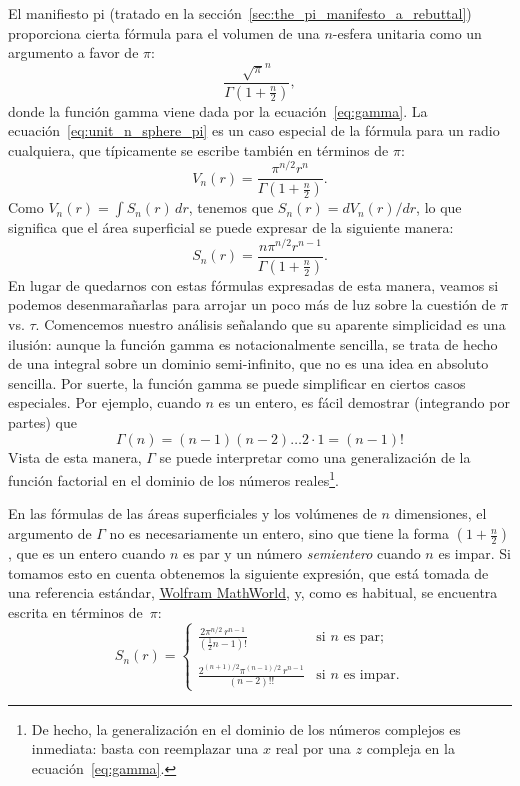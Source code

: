 El manifiesto pi (tratado en la sección~\ref{sec:the_pi_manifesto_a_rebuttal}) proporciona cierta fórmula para el volumen de una $n$-esfera unitaria como un argumento a favor de $\pi$:
\begin{equation}
\label{eq:unit_n_sphere_pi}
\frac{\sqrt{\pi}^{n} }{\Gamma(1 + \frac{n}{2})},
\end{equation}
donde la función gamma viene dada por la ecuación~\eqref{eq:gamma}. La ecuación~\eqref{eq:unit_n_sphere_pi} es un caso especial de la fórmula para un radio cualquiera, que típicamente se escribe también en términos de $\pi$:
\begin{equation}
\label{eq:n_sphere_pi}
V_n(r) = \frac{\pi^{n/2} r^n}{\Gamma(1 + \frac{n}{2})}.
\end{equation}
Como $V_n(r) = \int S_n(r)\,dr$, tenemos que $S_n(r) = dV_n(r)/dr$, lo que significa que el área superficial se puede expresar de la siguiente manera:
\begin{equation}
\label{eq:n_sphere_pi_r}
S_n(r) = \frac{n \pi^{n/2} r^{n-1}}{\Gamma(1 + \frac{n}{2})}.
\end{equation}
En lugar de quedarnos con estas fórmulas expresadas de esta manera, veamos si podemos desenmarañarlas para arrojar un poco más de luz sobre la cuestión de $\pi$ vs. $\tau$. Comencemos nuestro análisis señalando que su aparente simplicidad es una ilusión: aunque la función gamma es notacionalmente sencilla, se trata de hecho de una integral sobre un dominio semi-infinito, que no es una idea en absoluto sencilla. Por suerte, la función gamma se puede simplificar en ciertos casos especiales. Por ejemplo, cuando $n$ es un entero, es fácil demostrar (integrando por partes) que
\[
\Gamma(n) = (n-1)(n-2)\ldots 2\cdot 1 = (n-1)!
\]
Vista de esta manera, $\Gamma$ se puede interpretar como una generalización de la función factorial en el dominio de los números reales\footnote{De hecho, la generalización en el dominio de los números complejos es inmediata: basta con reemplazar una $x$ real por una  $z$ compleja en la ecuación~\eqref{eq:gamma}.}.

En las fórmulas de las áreas superficiales y los volúmenes de $n$ dimensiones, el argumento de $\Gamma$ no es necesariamente un entero, sino que tiene la forma $\left(1 + \frac{n}{2}\right)$, que es un entero cuando $n$ es par y un número \emph{semientero} cuando $n$ es impar. Si tomamos esto en cuenta obtenemos la siguiente expresión, que está tomada de una referencia estándar, \href{http://mathworld.wolfram.com/Hypersphere.html}{Wolfram MathWorld}, y, como es habitual, se encuentra escrita en términos de~$\pi$:
\begin{equation}
\label{eq:surface_area_mathworld}
S_n(r) = \begin{cases}
\displaystyle \frac{2\pi^{n/2}\,r^{n-1}}{(\frac{1}{2}n - 1)!} & \text{si } n \text{ es par}; \\ \\
 \displaystyle \frac{2^{(n+1)/2}\pi^{(n-1)/2}\,r^{n-1}}{(n-2)!!} & \text{si } n \text{ es impar}.
\end{cases}
\end{equation}

